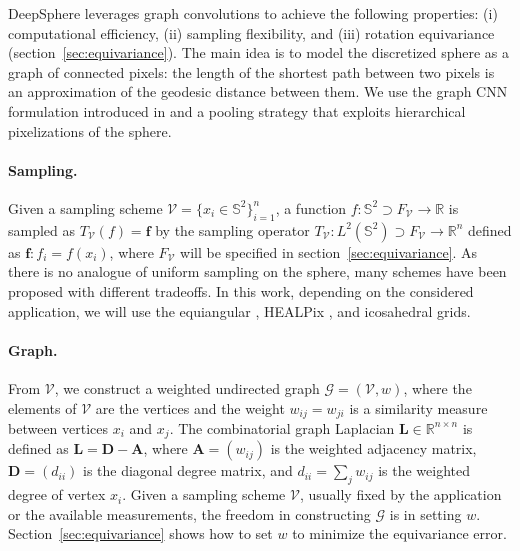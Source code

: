 \documentclass{article} %
\renewcommand{\b}[1]{{\bm{#1}}}  %
\newcommand{\R}{\mathbb{R}}
\renewcommand{\S}{\mathbb{S}}
\newcommand{\G}{\mathcal{G}}  %
\newcommand{\V}{\mathcal{V}}  %
\DeclareMathOperator*{\diag}{diag}
\newcommand{\figref}[1]{figure~\ref{fig:#1}}
\newcommand{\secref}[1]{section~\ref{sec:#1}}
\newcommand{\Secref}[1]{Section~\ref{sec:#1}}
\begin{document}
DeepSphere leverages graph convolutions to achieve the following properties: (i) computational efficiency, (ii) sampling flexibility, and (iii) rotation equivariance (\secref{equivariance}).
The main idea is to model the discretized sphere as a graph of connected pixels: the length of the shortest path between two pixels is an approximation of the geodesic distance between them.
We use the graph CNN formulation introduced in \citep{defferrard2016graphnn} and a pooling strategy that exploits hierarchical pixelizations of the sphere.

\paragraph{Sampling.}
Given a sampling scheme $\V = \{x_i \in \S^2\}_{i=1}^n$, a function $f : \S^2 \supset F_\V \to \R$ is sampled as $T_\V(f) = \b{f}$ by the sampling operator $T_\V: L^2(\S^2) \supset F_\V \to \R^n$ defined as $\b{f}: f_i=f(x_i)$, where $F_\V$ will be specified in \secref{equivariance}.
As there is no analogue of uniform sampling on the sphere, many schemes have been proposed with different tradeoffs.
In this work, depending on the considered application, we will use the equiangular \citep{driscoll1994Fouriersphere}, HEALPix \citep{gorski2005healpix}, and icosahedral \citep{baumgardner1985icosahedral} grids.

\paragraph{Graph.}
From $\V$, we construct a weighted undirected graph $\G = (\V, w)$, where the elements of $\V$ are the vertices and the weight $w_{ij} = w_{ji}$ is a similarity measure between vertices $x_i$ and $x_j$.
The combinatorial graph Laplacian $\b{L} \in \R^{n \times n}$ is defined as $\b{L} = \b{D} - \b{A}$, where $\b{A} = (w_{ij})$ is the weighted adjacency matrix, $\b{D} = (d_{ii})$ is the diagonal degree matrix, and $d_{ii} = \sum_j w_{ij}$ is the weighted degree of vertex $x_i$.
Given a sampling scheme $\V$, usually fixed by the application or the available measurements, the freedom in constructing $\G$ is in setting $w$.
\Secref{equivariance} shows how to set $w$ to minimize the equivariance error.
\end{document}
